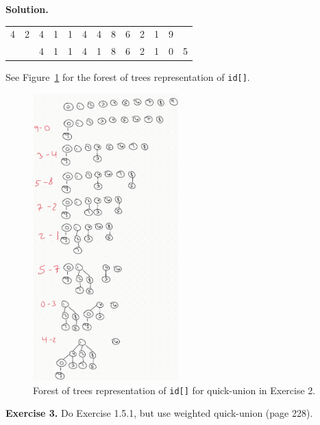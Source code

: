 \documentclass[12pt, a4paper]{article}
\newenvironment{ex}[2][Exercise]
{\par\medskip\noindent \textbf{#1 #2.}}
{\medskip}
\newenvironment{sol}[1][Solution]
{\par\medskip\noindent \textbf{#1.} }
{\medskip}
\begin{document}
\begin{sol}
\begin{center}
\begin{tabular}{cc|cccccccccc|c}
				4  & 2  & {\color{green} 4} & {\color{green} 1} & {\color{green} 1} & {\color{green} 4} & {\color{green} 4} & 8 & 6 & 2 & 1 & {\color{green} 9} & {}\\
				{} & {} & 4 & 1 & 1 & 4 & {\color{red} 1} & 8 & 6 & 2 & 1 & 0 & 5\\
			\end{tabular}
		\end{center}
		See Figure~\ref{ex-02} for the forest of trees representation of \texttt{id[]}.
		\begin{figure}
			\centering
			\includegraphics[width=0.5\textwidth]{exercise-02-quick-union-forest-of-trees}
			\caption{Forest of trees representation of \texttt{id[]} for quick-union in Exercise 2.}
			\label{ex-02}
		\end{figure}
	\end{sol}
	\begin{ex}{3}
		Do Exercise 1.5.1, but use weighted quick-union (page 228).
	\end{ex}
\end{document}
